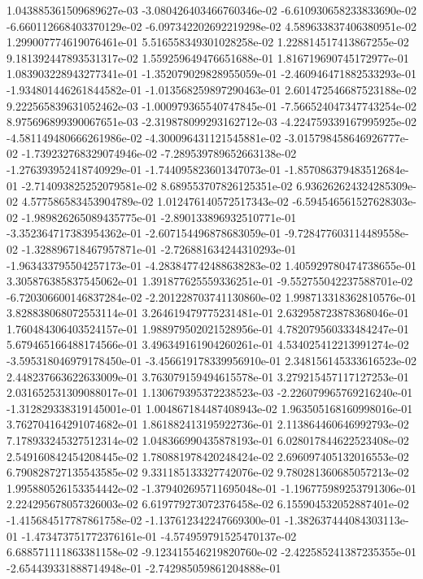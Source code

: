 1.043885361509689627e-03
-3.080426403466760346e-02
-6.610930658233833690e-02
-6.660112668403370129e-02
-6.097342202692219298e-02
4.589633837406380951e-02
1.299007774619076461e-01
5.516558349301028258e-02
1.228814517413867255e-02
9.181392447893531317e-02
1.559259649476651688e-01
1.816719690745172977e-01
1.083903228943277341e-01
-1.352079029828955059e-01
-2.460946471882533293e-01
-1.934801446261844582e-01
-1.013568259897290463e-01
2.601472546687523188e-02
9.222565839631052462e-03
-1.000979365540747845e-01
-7.566524047347743254e-02
8.975696899390067651e-03
-2.319878099293162712e-03
-4.224759339167995925e-02
-4.581149480666261986e-02
-4.300096431121545881e-02
-3.015798458646926777e-02
-1.739232768329074946e-02
-7.289539789652663138e-02
-1.276393952418740929e-01
-1.744095823601347073e-01
-1.857086379483512684e-01
-2.714093825252079581e-02
8.689553707826125351e-02
6.936262624324285309e-02
4.577586583453904789e-02
1.012476140572517343e-02
-6.594546561527628303e-02
-1.989826265089435775e-01
-2.890133896932510771e-01
-3.352364717383954362e-01
-2.607154496878683059e-01
-9.728477603114489558e-02
-1.328896718467957871e-01
-2.726881634244310293e-01
-1.963433795504257173e-01
-4.283847742488638283e-02
1.405929780474738655e-01
3.305876385837545062e-01
1.391877625559336251e-01
-9.552755042237588701e-02
-6.720306600146837284e-02
-2.201228703741130860e-02
1.998713318362810576e-01
3.828838068072553114e-01
3.264619479775231481e-01
2.632958723878368046e-01
1.760484306403524157e-01
1.988979502021528956e-01
4.782079560333484247e-01
5.679465166488174566e-01
3.496349161904260261e-01
4.534025412213991274e-02
-3.595318046979178450e-01
-3.456619178339956910e-01
2.348156145333616523e-02
2.448237663622633009e-01
3.763079159494615578e-01
3.279215457117127253e-01
2.031652531309088017e-01
1.130679395372238523e-03
-2.226079965769216240e-01
-1.312829338319145001e-01
1.004867184487408943e-02
1.963505168160998016e-01
3.762704164291074682e-01
1.861882413195922736e-01
2.113864460646992793e-02
7.178933245327512314e-02
1.048366990435878193e-01
6.028017844622523408e-02
2.549160842454208445e-02
1.780881978420248424e-02
2.696097405132016553e-02
6.790828727135543585e-02
9.331185133327742076e-02
9.780281360685057213e-02
1.995880526153354442e-02
-1.379402695711695048e-01
-1.196775989253791306e-01
2.224295678057326003e-02
6.619779273072376458e-02
6.155904532052887401e-02
-1.415684517787861758e-02
-1.137612342247669300e-01
-1.382637444084303113e-01
-1.473473751772376161e-01
-4.574959791525470137e-02
6.688571111863381158e-02
-9.123415546219820760e-02
-2.422585241387235355e-01
-2.654439331888714948e-01
-2.742985059861204888e-01
